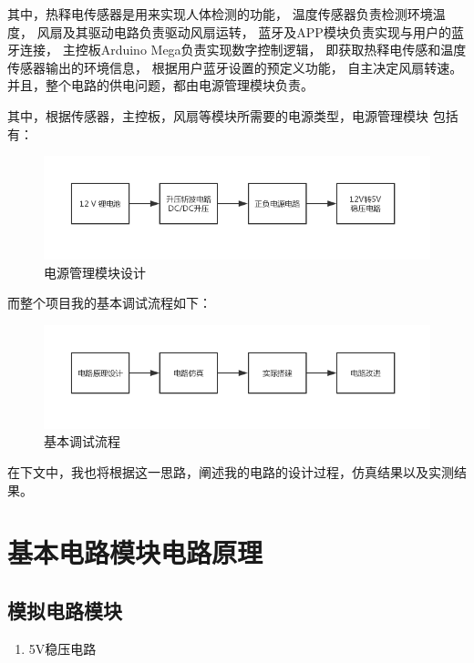 \documentclass{article}
\begin{document}
\begin{spacing}{1.5}
其中，热释电传感器是用来实现人体检测的功能，
温度传感器负责检测环境温度，
风扇及其驱动电路负责驱动风扇运转，
蓝牙及APP模块负责实现与用户的蓝牙连接，
主控板Arduino Mega负责实现数字控制逻辑，
即获取热释电传感和温度传感器输出的环境信息，
根据用户蓝牙设置的预定义功能，
自主决定风扇转速。
并且，整个电路的供电问题，都由电源管理模块负责。

其中，根据传感器，主控板，风扇等模块所需要的电源类型，电源管理模块
包括有：

\begin{figure}[H]
    \centering
    \includegraphics[scale=0.4]{fig/design/total1.png}
    \caption{电源管理模块设计}
    \label{fig:design_total1}
\end{figure}

而整个项目我的基本调试流程如下：

\begin{figure}[H]
    \centering
    \includegraphics[scale=0.4]{fig/design/flow.png}
    \caption{基本调试流程}
    \label{fig:design_flow}
\end{figure}

在下文中，我也将根据这一思路，阐述我的电路的设计过程，仿真结果以及实测结果。

 
\section{基本电路模块电路原理}

    \subsection{模拟电路模块}

    \begin{enumerate}
        \item 5V稳压电路
        

\end{enumerate}
\end{spacing}
\end{document}
